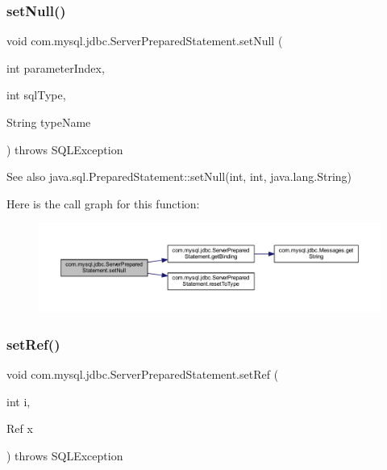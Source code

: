 \subsubsection{\texorpdfstring{set\+Null()}{setNull()}\hspace{0.1cm}{\footnotesize\ttfamily [2/2]}}
{\footnotesize\ttfamily void com.\+mysql.\+jdbc.\+Server\+Prepared\+Statement.\+set\+Null (\begin{DoxyParamCaption}\item[{int}]{parameter\+Index,  }\item[{int}]{sql\+Type,  }\item[{String}]{type\+Name }\end{DoxyParamCaption}) throws S\+Q\+L\+Exception}

\begin{DoxySeeAlso}{See also}
java.\+sql.\+Prepared\+Statement\+::set\+Null(int, int, java.\+lang.\+String) 
\end{DoxySeeAlso}
Here is the call graph for this function\+:
\nopagebreak
\begin{figure}[H]
\begin{center}
\leavevmode
\includegraphics[width=350pt]{classcom_1_1mysql_1_1jdbc_1_1_server_prepared_statement_a1b4bbc47755290d3b7ff6598aa127389_cgraph}
\end{center}
\end{figure}
\mbox{\label{classcom_1_1mysql_1_1jdbc_1_1_server_prepared_statement_a5f91135ca91172666ffc7998eb6ee95c}} 
\subsubsection{\texorpdfstring{set\+Ref()}{setRef()}}
{\footnotesize\ttfamily void com.\+mysql.\+jdbc.\+Server\+Prepared\+Statement.\+set\+Ref (\begin{DoxyParamCaption}\item[{int}]{i,  }\item[{Ref}]{x }\end{DoxyParamCaption}) throws S\+Q\+L\+Exception}

